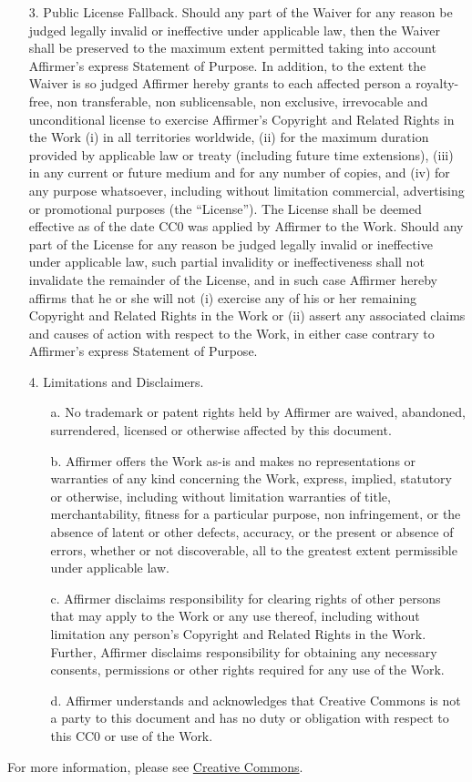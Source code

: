 \begin{enumerate}
\item[3.] Public License Fallback. Should any part of the Waiver for any reason be
judged legally invalid or ineffective under applicable law, then the Waiver
shall be preserved to the maximum extent permitted taking into account
Affirmer's express Statement of Purpose. In addition, to the extent the Waiver
is so judged Affirmer hereby grants to each affected person a royalty-free,
non transferable, non sublicensable, non exclusive, irrevocable and
unconditional license to exercise Affirmer's Copyright and Related Rights in
the Work (i) in all territories worldwide, (ii) for the maximum duration
provided by applicable law or treaty (including future time extensions), (iii)
in any current or future medium and for any number of copies, and (iv) for any
purpose whatsoever, including without limitation commercial, advertising or
promotional purposes (the ``License''). The License shall be deemed effective as
of the date CC0 was applied by Affirmer to the Work. Should any part of the
License for any reason be judged legally invalid or ineffective under
applicable law, such partial invalidity or ineffectiveness shall not
invalidate the remainder of the License, and in such case Affirmer hereby
affirms that he or she will not (i) exercise any of his or her remaining
Copyright and Related Rights in the Work or (ii) assert any associated claims
and causes of action with respect to the Work, in either case contrary to
Affirmer's express Statement of Purpose.

\item[4.] Limitations and Disclaimers.
	\begin{enumerate}
		\item[a.] No trademark or patent rights held by Affirmer are waived, abandoned,
  surrendered, licensed or otherwise affected by this document.

		\item[b.] Affirmer offers the Work as-is and makes no representations or warranties
  of any kind concerning the Work, express, implied, statutory or otherwise,
  including without limitation warranties of title, merchantability, fitness
  for a particular purpose, non infringement, or the absence of latent or
  other defects, accuracy, or the present or absence of errors, whether or not
  discoverable, all to the greatest extent permissible under applicable law.

		\item[c.] Affirmer disclaims responsibility for clearing rights of other persons
  that may apply to the Work or any use thereof, including without limitation
  any person's Copyright and Related Rights in the Work. Further, Affirmer
  disclaims responsibility for obtaining any necessary consents, permissions
  or other rights required for any use of the Work.

		\item[d.] Affirmer understands and acknowledges that Creative Commons is not a
  party to this document and has no duty or obligation with respect to this
  CC0 or use of the Work.
	\end{enumerate}
\end{enumerate}

For more information, please see
\href{http://creativecommons.org/publicdomain/zero/1.0/}{Creative Commons}.